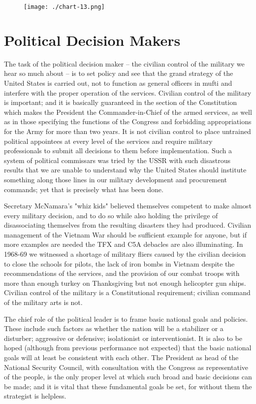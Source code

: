 \begin{figure}[h!]
    \texttt{[image: ./chart-13.png]}
    \label{fig:chart-13}
\end{figure}

\section{Political Decision Makers}
The task of the political decision maker -- the civilian control of the military we hear so much about -- is to set policy and see that the grand strategy of the United States is carried out, not to function as general officers in mufti and interfere with the proper operation of the services. Civilian control of the military is important; and it is basically guaranteed in the section of the Constitution which makes the President the Commander-in-Chief of the armed services, as well as in those specifying the functions of the Congress and forbidding appropriations for the Army for more than two years. It is not civilian control to place untrained political appointees at every level of the services and require military professionals to submit all decisions to them before implementation. Such a system of political commissars was tried by the USSR with such disastrous results that we are unable to understand why the United States should institute something along those lines in our military development and procurement commands; yet that is precisely what has been done.

Secretary McNamara's "whiz kids" believed themselves competent to make almost every military decision, and to do so while also holding the privilege of disassociating themselves from the resulting disasters they had produced. Civilian management of the Vietnam War should be sufficient example for anyone, but if more examples are needed the TFX and C5A debacles are also illuminating. In 1968-69 we witnessed a shortage of military fliers caused by the civilian decision to close the schools for pilots, the lack of iron bombs in Vietnam despite the recommendations of the services, and the provision of our combat troops with more than enough turkey on Thanksgiving but not enough helicopter gun ships. Civilian control of the military is a Constitutional requirement; civilian command of the military arts is not.

The chief role of the political leader is to frame basic national goals and policies. These include such factors as whether the nation will be a stabilizer or a disturber; aggressive or defensive; isolationist or interventionist. It is also to be hoped (although from previous performance not expected) that the basic national goals will at least be consistent with each other. The President as head of the National Security Council, with consultation with the Congress as representative of the people, is the only proper level at which such broad and basic decisions can be made; and it is vital that these fundamental goals be set, for without them the strategist is helpless.

